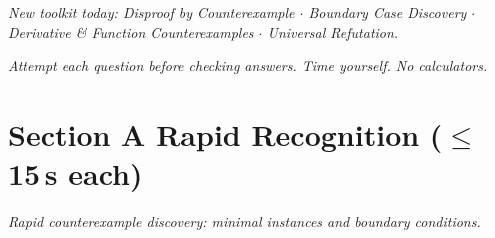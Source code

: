 \documentclass[11pt,a4paper]{article}
\begin{document}
\noindent\textit{New toolkit today: Disproof by Counterexample $\cdot$ Boundary Case Discovery $\cdot$ Derivative \& Function Counterexamples $\cdot$ Universal Refutation.}

\vspace{2pt}
\noindent\textit{Attempt each question before checking answers. Time yourself. No calculators.}

\section*{Section A \quad Rapid Recognition \hfill{\normalfont\small($\leq$15\,s each)}}

\noindent\textit{Rapid counterexample discovery: minimal instances and boundary conditions.}
\end{document}
